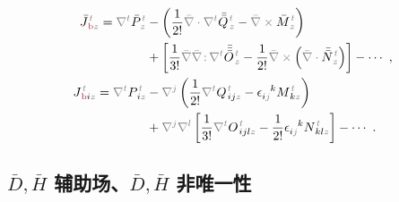 \begin{subequations}
\begin{align}
\bar{J}^{\;\!\mathcolor{gray}{t}}_{\;\!\textcolor{Maroon}{\text{b}}\mathcolor{gray}{z}} = \mathcolor{gray}{\nabla^t} \bar{P}^{\;\!\mathcolor{gray}{t}}_{\;\!\mathcolor{gray}{z}} &- \left( \frac{1}{2!} \mathcolor{gray}{\bar{\nabla} \cdot} \mathcolor{gray}{\nabla^t} \bar{\bar{Q}}^{\;\!\mathcolor{gray}{t}}_{\;\!\mathcolor{gray}{z}} - \mathcolor{gray}{\bar{\nabla} \times} \bar{M}^{\;\!\mathcolor{gray}{t}}_{\;\!\mathcolor{gray}{z}} \right) \label{eq:J-b} \\ &+ \left[ \frac{1}{3!} \mathcolor{gray}{\bar{\nabla}} \mathcolor{gray}{\bar{\nabla} \colon}\! \mathcolor{gray}{\nabla^t} \bar{\bar{\bar{O}}}^{\;\!\mathcolor{gray}{t}}_{\;\!\mathcolor{gray}{z}} - \frac{1}{2!} \mathcolor{gray}{\bar{\nabla} \times} \left( \mathcolor{gray}{\bar{\nabla} \cdot}  \bar{\bar{N}}^{\;\!\mathcolor{gray}{t}}_{\;\!\mathcolor{gray}{z}} \right) \right] - \cdots~, \\
J^{\;\!\mathcolor{gray}{t}}_{\;\!\textcolor{Maroon}{\text{b}} i \mathcolor{gray}{z}} = \mathcolor{gray}{\nabla^t} P^{\;\!\mathcolor{gray}{t}}_{\;\! i\mathcolor{gray}{z}} &- \mathcolor{gray}{\nabla^j} \left( \frac{1}{2!} \mathcolor{gray}{\nabla^t} Q^{\;\!\mathcolor{gray}{t}}_{\;\! ij\mathcolor{gray}{z}} - \epsilon^{\hphantom{ij}k}_{i\mathcolor{gray}{j}} M^{\;\!\mathcolor{gray}{t}}_{\;\! k\mathcolor{gray}{z}} \right) \label{eq:j-b} \\ &+ \mathcolor{gray}{\nabla^j} \mathcolor{gray}{\nabla^l} \left[ \frac{1}{3!}  \mathcolor{gray}{\nabla^t} O^{\;\!\mathcolor{gray}{t}}_{\;\! ijl\mathcolor{gray}{z}} - \frac{1}{2!} \epsilon^{\hphantom{ij}k}_{i\mathcolor{gray}{j}} N^{\;\!\mathcolor{gray}{t}}_{\;\! kl\mathcolor{gray}{z}} \right] - \cdots~.
\end{align}
\end{subequations}

\subsection{$\bar{D},\bar{H}$ 辅助场、$\bar{D},\bar{H}$ 非唯一性}\label{ssec:DHEB-boundary}


